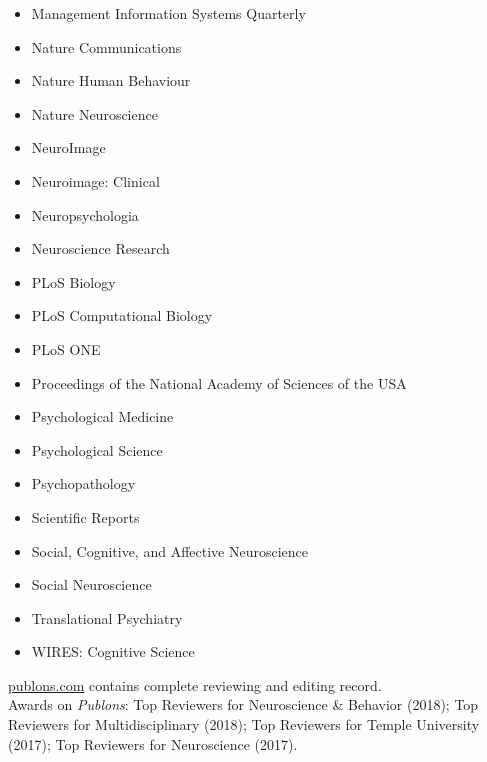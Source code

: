 \documentclass[11pt, letterpaper]{article}
\begin{document}
\begin{multicols}{2}
\begin{itemize}[noitemsep]
\item Management Information Systems Quarterly 
\item Nature Communications 
\item Nature Human Behaviour 
\item Nature Neuroscience
\item NeuroImage 
\item Neuroimage: Clinical 
\item Neuropsychologia 
\item Neuroscience Research 
\item PLoS Biology 
\item PLoS Computational Biology 
\item PLoS ONE 
\item Proceedings of the National Academy of Sciences of the USA
\item Psychological Medicine 
\item Psychological Science 
\item Psychopathology 
\item Scientific Reports 
\item Social, Cognitive, and Affective Neuroscience 
\item Social Neuroscience
\item Translational Psychiatry
\item WIRES: Cognitive Science
\end{itemize}
\end{multicols}

\aiPublons \hspace{.05cm} \href{https://publons.com/author/1204254/david-v-smith}{publons.com} contains complete reviewing and editing record. \\ [.2cm]
Awards on \textit{Publons}: Top Reviewers for Neuroscience \& Behavior (2018); Top Reviewers for Multidisciplinary (2018); Top Reviewers for Temple University (2017); Top Reviewers for Neuroscience (2017).

\pagebreak
\end{document}
